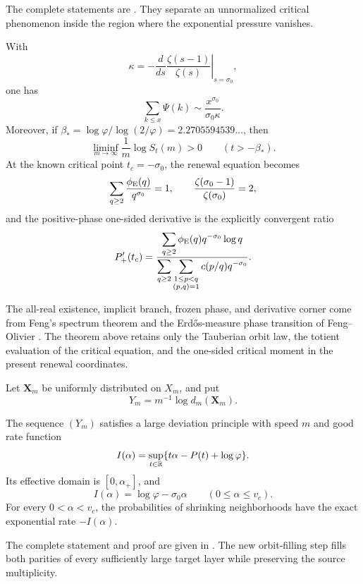 The complete statements are
.
They separate an unnormalized critical phenomenon inside the region where
the exponential pressure vanishes.

\begin{theoremF}
With
\[
 \kappa=-\left.\frac{d}{ds}\frac{\zeta(s-1)}{\zeta(s)}
 \right|_{s=\sigma_0},
\]
one has
\[
 \sum_{k\le x}\Psi(k)\sim
 \frac{x^{\sigma_0}}{\sigma_0\kappa}.
\]
Moreover, if
\(\beta_*=\log\varphi/\log(2/\varphi)=2.2705594539\ldots\), then
\[
 \liminf_{m\to\infty}\frac1m\log S_t(m)>0
 \qquad(t>-\beta_*).
\]
At the known critical point \(t_c=-\sigma_0\), the renewal equation becomes
\[
 \sum_{q\ge2}\frac{\phi_{\rm E}(q)}{q^{\sigma_0}}=1,
 \qquad
 \frac{\zeta(\sigma_0-1)}{\zeta(\sigma_0)}=2,
\]
and the positive-phase one-sided derivative is the explicitly convergent
ratio
\[
 P'_+(t_c)=
 \frac{\displaystyle\sum_{q\ge2}\phi_{\rm E}(q)q^{-\sigma_0}\log q}
      {\displaystyle\sum_{q\ge2}\sum_{\substack{1\le p<q\\(p,q)=1}}
       c(p/q)q^{-\sigma_0}}.
\]
\end{theoremF}

The all-real existence, implicit branch, frozen phase, and derivative corner
come from Feng's spectrum theorem \cite[Thm.~1.3]{Feng2005} and the
Erd\H{o}s-measure phase transition of Feng--Olivier
\cite[Thms.~2.9--2.10 and App.~A]{FengOlivier2003}.  The theorem above retains
only the Tauberian orbit law, the totient evaluation of the critical equation,
and the one-sided critical moment in the present renewal coordinates.

Let \(\mathbf X_m\) be uniformly distributed on \(X_m\), and put
\[
 Y_m=m^{-1}\log d_m(\mathbf X_m).
\]

\begin{theoremG}
The sequence \((Y_m)\) satisfies a large deviation principle with speed
\(m\) and good rate function
\[
 I(\alpha)=\sup_{t\in\mathbb{R}}\{t\alpha-P(t)+\log\varphi\}.
\]
Its effective domain is \([0,\alpha_+]\), and
\[
 I(\alpha)=\log\varphi-\sigma_0\alpha
 \qquad(0\le\alpha\le v_c).
\]
For every \(0<\alpha<v_c\), the probabilities of shrinking neighborhoods
have the exact exponential rate \(-I(\alpha)\).
\end{theoremG}

The complete statement and proof are given in .
The new orbit-filling step fills both parities of every sufficiently large
target layer while preserving the source multiplicity.


